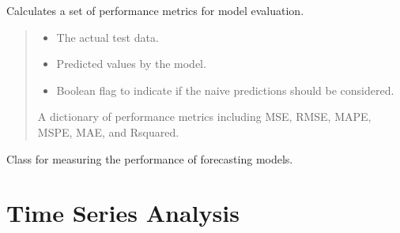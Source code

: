 \documentclass[letterpaper,10pt,english]{sphinxmanual}
\begin{document}
\begin{fulllineitems}
\begin{fulllineitems}
\label{\detokenize{docs/performance_measurement:performance_measurement.PerfMeasure.get_performance_metrics}}
\pysigstartsignatures
{}
\pysigstopsignatures
\sphinxAtStartPar
Calculates a set of performance metrics for model evaluation.
\begin{quote}\begin{description}
\begin{itemize}
\item {} 
\sphinxAtStartPar
{} \textendash{} The actual test data.

\item {} 
\sphinxAtStartPar
{} \textendash{} Predicted values by the model.

\item {} 
\sphinxAtStartPar
{} \textendash{} Boolean flag to indicate if the naive predictions should be considered.

\end{itemize}

\sphinxAtStartPar
A dictionary of performance metrics including MSE, RMSE, MAPE, MSPE, MAE, and R\sphinxhyphen{}squared.

\end{description}\end{quote}

\end{fulllineitems}


\end{fulllineitems}


\sphinxAtStartPar
Class for measuring the performance of forecasting models.

\sphinxstepscope


\section{Time Series Analysis}
\label{\detokenize{docs/time_series_analysis:time-series-analysis}}\label{\detokenize{docs/time_series_analysis::doc}}\label{\detokenize{docs/time_series_analysis:module-time_series_analysis}}
\end{document}

